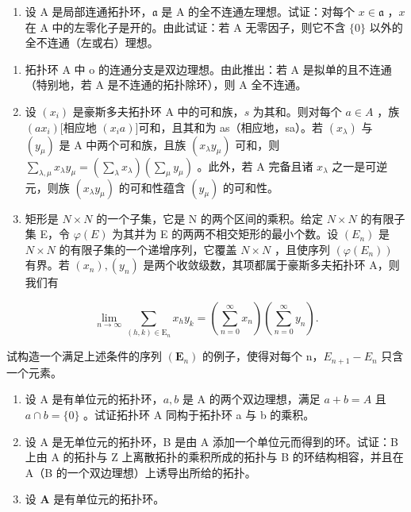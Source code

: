 \begin{enumerate}
\def\labelenumi{\alph{enumi})}
\setcounter{enumi}{1}
\tightlist
\item
  设 A 是局部连通拓扑环，\(\mathfrak{a}\) 是 A 的全不连通左理想。试证：对每个 \(x \in \mathfrak{a}\) ，\(x\) 在 A 中的左零化子是开的。由此试证：若 A 无零因子，则它不含 \(\{0\}\) 以外的全不连通（左或右）理想。
\end{enumerate}

\begin{enumerate}
\def\labelenumi{\arabic{enumi})}
\setcounter{enumi}{2}
\item
  拓扑环 A 中 o 的连通分支是双边理想。由此推出：若 A 是拟单的且不连通（特别地，若 A 是不连通的拓扑除环），则 A 全不连通。
\item
  设 \((x_{i})\) 是豪斯多夫拓扑环 A 中的可和族，\(s\) 为其和。则对每个 \(a \in A\) ，族 \((ax_{i})\){[}相应地 \((x_{i}a)]\)可和，且其和为 as（相应地，sa）。若 \((x_{\lambda})\) 与 \((y_{\mu})\) 是 A 中两个可和族，且族 \((x_{\lambda}y_{\mu})\) 可和，则 \(\sum_{\lambda,\mu} x_{\lambda} y_{\mu} = \left( \sum_{\lambda} x_{\lambda} \right) \left( \sum_{\mu} y_{\mu} \right)\) 。此外，若 A 完备且诸 \(x_{\lambda}\) 之一是可逆元，则族 \((x_{\lambda}y_{\mu})\) 的可和性蕴含 \((y_{\mu})\) 的可和性。
\item
  矩形是 \(N \times N\) 的一个子集，它是 N 的两个区间的乘积。给定 \(N \times N\) 的有限子集 E，令 \(\varphi(E)\) 为其并为 E 的两两不相交矩形的最小个数。设 \((E_n)\) 是 \(N \times N\) 的有限子集的一个递增序列，它覆盖 \(N \times N\) ，且使序列 \((\varphi(E_n))\) 有界。若 \((x_n), (y_n)\) 是两个收敛级数，其项都属于豪斯多夫拓扑环 A，则我们有
\end{enumerate}

\[
\lim _ {n \rightarrow \infty} \sum_ {(h, k) \in \mathrm{E} _ {n}} x _ {h} y _ {k} = \left(\underset {n = 0} {\overset {\infty} {\sum}} x _ {n}\right)\left(\underset {n = 0} {\overset {\infty} {\sum}} y _ {n}\right).
\]

试构造一个满足上述条件的序列 \((\mathbf{E}_{n})\) 的例子，使得对每个 n，\(E_{n+1} - E_{n}\) 只含一个元素。

\begin{enumerate}
\def\labelenumi{\arabic{enumi})}
\setcounter{enumi}{5}
\item
  设 A 是有单位元的拓扑环，\(a, b\) 是 A 的两个双边理想，满足 \(a + b = A\) 且 \(a \cap b = \{0\}\) 。试证拓扑环 A 同构于拓扑环 a 与 b 的乘积。
\item
  设 A 是无单位元的拓扑环，B 是由 A 添加一个单位元而得到的环。试证：B 上由 A 的拓扑与 Z 上离散拓扑的乘积所成的拓扑与 B 的环结构相容，并且在 A（B 的一个双边理想）上诱导出所给的拓扑。
\item
  设 \(\mathbf{A}\) 是有单位元的拓扑环。
\end{enumerate}

